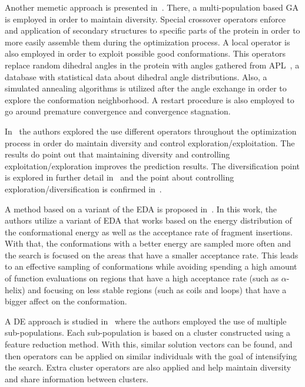 Another memetic approach is presented in~\cite{correa2016memetic}. There, a multi-population
based \ac{GA} is employed in order to maintain diversity. Special crossover operators enforce
and application of secondary structures to specific parts of the protein in order
to more easily assemble them during the optimization process. A local operator is
also employed in order to exploit possible good conformations. This operators
replace random dihedral angles in the protein with angles gathered from
\ac{APL}~\cite{borguesan2015apl}, a database with statistical data about dihedral angle
distributions. Also, a simulated annealing algorithms is utilized after the angle
exchange in order to explore the conformation neighborhood. A restart procedure is also
employed to go around premature convergence and convergence stagnation.

In~\cite{narloch2017protein} the authors explored the use different operators
throughout the optimization process in order do maintain diversity and control
exploration/exploitation. The results do point out that maintaining diversity
and controlling exploitation/exploration improves the prediction results.
The diversification point is explored in further detail in~\cite{narloch2016diversification}
and the point about controlling exploration/diversification is confirmed
in~\cite{simoncini2017balancing}.

A method based on a variant of the \ac{EDA} is proposed in~\cite{hao2017double}. In
this work, the authors utilize a variant of \ac{EDA} that works based on the energy
distribution of the conformational energy as well as the acceptance rate of fragment
insertions. With that, the conformations with a better energy are sampled more often
and the search is focused on the areas that have a smaller acceptance rate. This
leads to an effective sampling of conformations while avoiding spending a high
amount of function evaluations on regions that have a high acceptance rate (such
as $\alpha$-helix) and focusing on less stable regions (such as coils and loops)
that have a bigger affect on the conformation.


A \ac{DE} approach is studied in~\cite{hao2017conformational} where the authors
employed the use of multiple sub-populations. Each sub-population is based on a cluster
constructed using a feature reduction method. With this, similar solution vectors
can be found, and then operators can be applied on similar individuals with the goal
of intensifying the search. Extra cluster operators are also applied and help
maintain diversity and share information between clusters.


